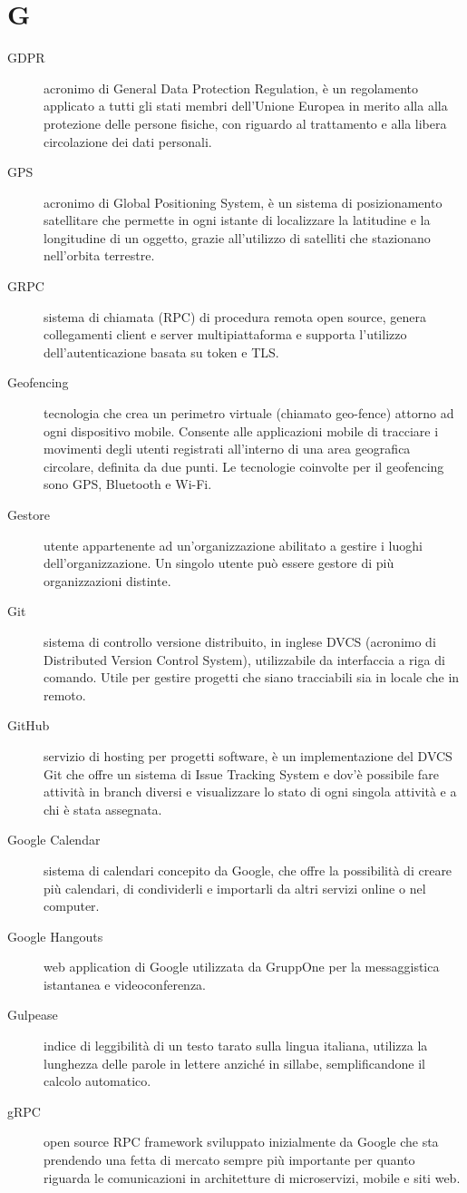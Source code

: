 \documentclass{article}
\begin{document}
\section{G}
\begin{description}
  \item[GDPR] acronimo di General Data Protection Regulation, è un regolamento applicato a tutti gli stati membri dell'Unione Europea in merito alla alla protezione delle persone fisiche, con riguardo al trattamento e alla libera circolazione dei dati personali.
  \item[GPS] acronimo di Global Positioning System, è un sistema di posizionamento satellitare che permette in ogni istante di localizzare la latitudine e la longitudine di un oggetto, grazie all'utilizzo di satelliti che stazionano nell'orbita terrestre.
  \item[GRPC] sistema di chiamata (RPC) di procedura remota open source, genera collegamenti client e server multipiattaforma e supporta l'utilizzo dell'autenticazione basata su token e TLS\@.
  \item[Geofencing] tecnologia che crea un perimetro virtuale (chiamato geo-fence) attorno ad ogni dispositivo mobile. Consente alle applicazioni mobile di tracciare i movimenti degli utenti registrati all'interno di una area geografica circolare, definita da due punti. Le tecnologie coinvolte per il geofencing sono GPS, Bluetooth e Wi-Fi.
  \item[Gestore] utente appartenente ad un'organizzazione abilitato a gestire i luoghi dell'organizzazione. Un singolo utente può essere gestore di più organizzazioni distinte.
  \item[Git] sistema di controllo versione distribuito, in inglese DVCS (acronimo di Distributed Version Control System), utilizzabile da interfaccia a riga di comando. Utile per gestire progetti che siano tracciabili sia in locale che in remoto.
  \item[GitHub] servizio di hosting per progetti software, è un implementazione del DVCS Git che offre un sistema di Issue Tracking System e dov'è possibile fare attività in branch diversi e visualizzare lo stato di ogni singola attività e a chi è stata assegnata.
  \item[Google Calendar] sistema di calendari concepito da Google, che offre la possibilità di creare più calendari, di condividerli e importarli da altri servizi online o nel computer.
  \item[Google Hangouts] web application di Google utilizzata da GruppOne per la messaggistica istantanea e videoconferenza.
  \item[Gulpease] indice di leggibilità di un testo tarato sulla lingua italiana, utilizza la lunghezza delle parole in lettere anziché in sillabe, semplificandone il calcolo automatico.
  \item[gRPC] open source RPC framework sviluppato inizialmente da Google che sta prendendo una fetta di mercato sempre più importante per quanto riguarda le comunicazioni in architetture di microservizi, mobile e siti web.
\end{description}
\newpage
\end{document}
